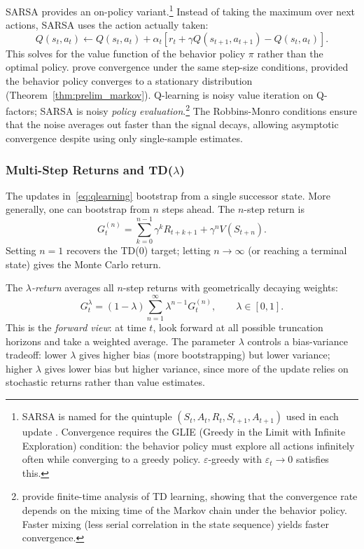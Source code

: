 SARSA provides an on-policy variant.\footnote{SARSA is named for the quintuple $(S_t, A_t, R_t, S_{t+1}, A_{t+1})$ used in each update \citep{rummery1994}. Convergence requires the GLIE (Greedy in the Limit with Infinite Exploration) condition: the behavior policy must explore all actions infinitely often while converging to a greedy policy. $\varepsilon$-greedy with $\varepsilon_t \to 0$ satisfies this.} Instead of taking the maximum over next actions, SARSA uses the action actually taken:
\begin{equation}
Q(s_t, a_t) \leftarrow Q(s_t, a_t) + \alpha_t \left[ r_t + \gamma Q(s_{t+1}, a_{t+1}) - Q(s_t, a_t) \right].
\end{equation}
This solves for the value function of the behavior policy $\pi$ rather than the optimal policy. \citet{singh2000} prove convergence under the same step-size conditions, provided the behavior policy converges to a stationary distribution (Theorem~\ref{thm:prelim_markov}). Q-learning is noisy value iteration on Q-factors; SARSA is noisy \emph{policy evaluation}.\footnote{\citet{bhandari2021finite} provide finite-time analysis of TD learning, showing that the convergence rate depends on the mixing time of the Markov chain under the behavior policy. Faster mixing (less serial correlation in the state sequence) yields faster convergence.} The Robbins-Monro conditions ensure that the noise averages out faster than the signal decays, allowing asymptotic convergence despite using only single-sample estimates.

\subsubsection{Multi-Step Returns and TD($\lambda$)}
\label{sec:td_lambda}

The updates in~\eqref{eq:qlearning} bootstrap from a single successor state. More generally, one can bootstrap from $n$ steps ahead. The $n$-step return is
\begin{equation}
G_t^{(n)} = \sum_{k=0}^{n-1} \gamma^k R_{t+k+1} + \gamma^n V(S_{t+n}).
\label{eq:n_step_return}
\end{equation}
Setting $n=1$ recovers the TD(0) target; letting $n \to \infty$ (or reaching a terminal state) gives the Monte Carlo return.

The \emph{$\lambda$-return} \citep{sutton1988} averages all $n$-step returns with geometrically decaying weights:
\begin{equation}
G_t^\lambda = (1-\lambda) \sum_{n=1}^{\infty} \lambda^{n-1} G_t^{(n)}, \qquad \lambda \in [0,1].
\label{eq:lambda_return}
\end{equation}
This is the \emph{forward view}: at time $t$, look forward at all possible truncation horizons and take a weighted average. The parameter $\lambda$ controls a bias-variance tradeoff: lower $\lambda$ gives higher bias (more bootstrapping) but lower variance; higher $\lambda$ gives lower bias but higher variance, since more of the update relies on stochastic returns rather than value estimates.

